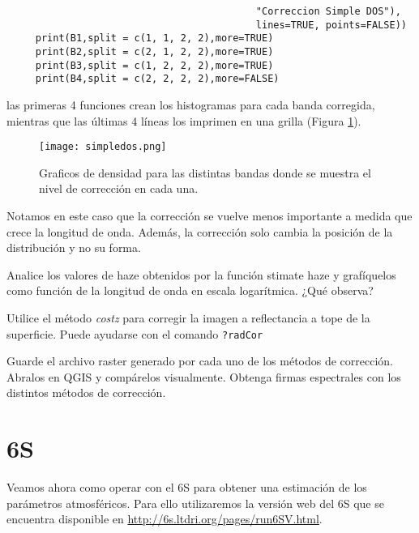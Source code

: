 \begin{exa}
\begin{lstlisting}
                                           "Correccion Simple DOS"),
                                           lines=TRUE, points=FALSE))
     print(B1,split = c(1, 1, 2, 2),more=TRUE)
     print(B2,split = c(2, 1, 2, 2),more=TRUE)
     print(B3,split = c(1, 2, 2, 2),more=TRUE)
     print(B4,split = c(2, 2, 2, 2),more=FALSE)
    \end{lstlisting}
    las primeras 4 funciones crean los histogramas para cada banda
    corregida, mientras que las \'ultimas 4 l\'ineas los imprimen en una grilla (Figura \ref{fig:simpledos}).
    \begin{figure}[h!]
    \begin{center}
        \texttt{[image: simpledos.png]}
    \end{center}
    \caption{Graficos de densidad para las distintas bandas donde se
        muestra el nivel de correcci\'on en cada una.}
    \label{fig:simpledos}
    \end{figure}
Notamos en este caso que la correcci\'on se vuelve menos importante a medida
que crece la longitud de onda. Adem\'as, la correcci\'on solo cambia la
posici\'on de la distribuci\'on y no su forma.

\end{exa}
\begin{act}
    Analice los valores de haze obtenidos por la funci\'on stimate haze y graf\'iquelos
    como funci\'on de la longitud de onda en escala logar\'itmica. ¿Qu\'e observa?
\end{act}

\begin{act}
    Utilice el m\'etodo \emph{costz} para corregir la imagen a reflectancia a tope
    de la superficie. Puede ayudarse con el comando \texttt{?radCor}
\end{act}

\begin{act}
    Guarde el archivo raster generado por cada uno de los m\'etodos de
    correcci\'on. Abralos en QGIS y comp\'arelos visualmente. Obtenga firmas
    espectrales con los distintos m\'etodos de correcci\'on.
\end{act}


\section{6S}
\label{sub:corr:6S}

Veamos ahora como operar con el 6S para obtener una estimaci\'on de los par\'ametros
atmosf\'ericos. Para ello utilizaremos la versi\'on web del 6S que se encuentra
disponible en \url{http://6s.ltdri.org/pages/run6SV.html}.

